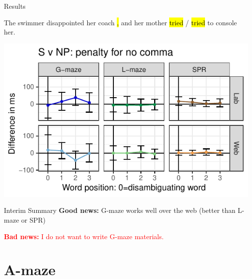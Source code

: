 \documentclass[12pt, xcolor=beamer,table,usenames,dvipsnames, ignorenonframetext, ngerman]{beamer}
\makeatletter
\let\HL\hl
\renewcommand\hl{%
	\let\set@color\beamerorig@set@color
	\let\reset@color\beamerorig@reset@color
	\HL}
\makeatother
\begin{document}
\begin{frame}{Results}
\begin{small}	
The swimmer disappointed her coach\hl{,} and her mother \hl{tried} / \hl{tried} to console her.
\end{small}
\includegraphics[width=\textwidth]{g_svnp.pdf}
\end{frame}

\begin{frame}{Interim Summary}
\textcolor{PineGreen}{\Large \textbf{Good news:} G-maze works well over the web (better than L-maze or SPR)}

\pause

\bigskip

\textcolor{Red}{\Large \textbf{Bad news:} I do not want to write G-maze materials.}


\end{frame}

\section{A-maze}
\end{document}
